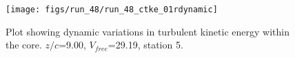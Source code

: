 \begin{figure}[H]
\centering
\texttt{[image: figs/run\_48/run\_48\_ctke\_01rdynamic]}
\caption{Plot showing dynamic variations in turbulent kinetic energy within the core. $z/c$=9.00, $V_{free}$=29.19, station 5.}
\label{fig:run_48_ctke_01rdynamic}
\end{figure}


